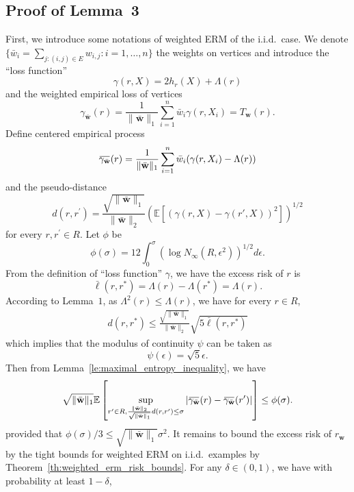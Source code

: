 \documentclass[letterpaper]{article} %
\def\DoubleColumn{}
\newcommand{\E}{\mathbb{E}}
\newcommand{\overbar}[1]{\mkern 1.5mu\overline{\mkern-1.5mu#1\mkern-1.5mu}\mkern 1.5mu}
\newcommand*\cen[1]{\overbar{#1}}
\newcommand{\weight}{\mathbf{w}}
\newcommand{\verticeweight}{\bar{\mathbf{w}}}
\newcommand{\relossf}{\bar{\ell}}
\newcommand{\cenprocess}[1]{\cen{\gamma_{#1}}}
\newcommand{\pair}[1]{(#1)}
\newcommand{\normo}[1]{\|#1\|_1}
\begin{document}
\subsection{Proof of Lemma~3} %
\label{sub:proof_of_lemma_3}
    First, we introduce some notations of weighted ERM of the i.i.d.\ case. 
    We denote $\{\bar{w}_i=\sum_{j:\pair{i,j}\in E}w_{i,j}: i=1,\dots,n\}$ the weights on vertices and introduce the ``loss function''
    \[\gamma(r, X)=2h_r(X)+\Lambda{}(r)\]
    and the weighted empirical loss of vertices
    \[\gamma_\verticeweight{}(r)=\frac{1}{\normo{\verticeweight{}}}\sum_{i=1}^n\bar{w}_i\gamma(r,X_i)=T_\weight{}(r).\]
    Define centered empirical process
    \[\cenprocess{\verticeweight}(r)=\frac{1}{\normo{\verticeweight{}}}\sum_{i=1}^n\bar{w}_i(\gamma(r,X_i)-\Lambda(r))\]
    and the pseudo-distance
    \[d(r,r^\prime) = \frac{\sqrt{\normo{\verticeweight{}}}}{\|\verticeweight\|_2}\left(\E[(\gamma(r,X)-\gamma(r',X))^2]\right)^{1/2}\]
    for every $r,r^\prime\in R$.
    Let $\phi$ be
    \begin{equation}
        \label{eq:proof_phi}
        \phi(\sigma)=12\int_0^{\sigma}(\log N_\infty(R,\epsilon^2))^{1/2}d\epsilon.
    \end{equation}
    From the definition of ``loss function'' $\gamma$, we have the excess risk of $r$ is
    \[\relossf(r,r^*)=\Lambda(r)-\Lambda(r^*)=\Lambda(r).\]
    According to Lemma~$1$, as $\Lambda^2(r)\le \Lambda(r)$, we have for every $r\in R$,
    \begin{align*}
        d(r,r^*)\le \frac{\sqrt{\normo{\verticeweight{}}}}{\|\verticeweight\|_2}\sqrt{5\relossf(r,r^*)}
    \end{align*}
    which implies that the modulus of continuity $\psi$ can be taken as
    \begin{equation}
        \label{eq:proof_psi}
        \psi(\epsilon)=\sqrt{5}\epsilon.
    \end{equation}
    Then from Lemma~\ref{le:maximal_entropy_inequality}, we have
    \[\sqrt{\normo{\verticeweight{}}}\E\left[\sup_{r^\prime\in R,\frac{\|\verticeweight\|_2}{\sqrt{\normo{\verticeweight{}}}}d(r,r^\prime)\le \sigma}|\cenprocess{\verticeweight}(r)-\cenprocess{\verticeweight}(r^\prime)|\right]\le \phi(\sigma).\]
    provided that $\phi(\sigma)/3\le \sqrt{\normo{\verticeweight{}}}\sigma^2$.
    It remains to bound the excess risk of $r_\weight{}$ by the tight bounds for weighted ERM on i.i.d.\ examples by Theorem~\ref{th:weighted_erm_risk_bounds}. For any $\delta\in(0,1)$, we have with probability at least $1-\delta$,
    \DoubleColumn
\end{document}
